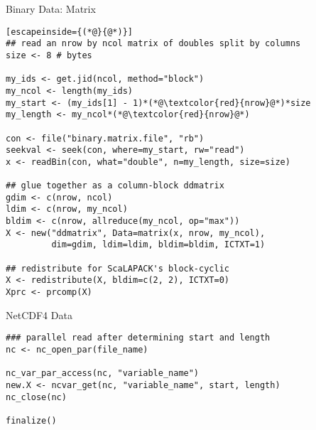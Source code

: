 \begin{frame}[fragile]
  \begin{exampleblock}{Binary Data: Matrix}\pause
    \begin{lstlisting}[escapeinside={(*@}{@*)}]
## read an nrow by ncol matrix of doubles split by columns
size <- 8 # bytes

my_ids <- get.jid(ncol, method="block")
my_ncol <- length(my_ids)
my_start <- (my_ids[1] - 1)*(*@\textcolor{red}{nrow}@*)*size
my_length <- my_ncol*(*@\textcolor{red}{nrow}@*)

con <- file("binary.matrix.file", "rb")
seekval <- seek(con, where=my_start, rw="read")
x <- readBin(con, what="double", n=my_length, size=size)

## glue together as a column-block ddmatrix
gdim <- c(nrow, ncol)
ldim <- c(nrow, my_ncol)
bldim <- c(nrow, allreduce(my_ncol, op="max"))
X <- new("ddmatrix", Data=matrix(x, nrow, my_ncol),
         dim=gdim, ldim=ldim, bldim=bldim, ICTXT=1)

## redistribute for ScaLAPACK's block-cyclic
X <- redistribute(X, bldim=c(2, 2), ICTXT=0)
Xprc <- prcomp(X) 
    \end{lstlisting}
  \end{exampleblock}
\end{frame}

\begin{frame}[fragile]
  \begin{exampleblock}{NetCDF4 Data}\pause
    \begin{lstlisting}
### parallel read after determining start and length
nc <- nc_open_par(file_name)

nc_var_par_access(nc, "variable_name")
new.X <- ncvar_get(nc, "variable_name", start, length)
nc_close(nc)

finalize()
    \end{lstlisting}
  \end{exampleblock}
\end{frame}

